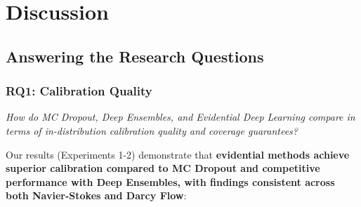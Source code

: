 \chapter{Discussion}

\section{Answering the Research Questions}

\subsection{RQ1: Calibration Quality}

\textit{How do MC Dropout, Deep Ensembles, and Evidential Deep Learning compare in terms of in-distribution calibration quality and coverage guarantees?}

Our results (Experiments 1-2) demonstrate that \textbf{evidential methods achieve superior calibration compared to MC Dropout and competitive performance with Deep Ensembles, with findings consistent across both Navier-Stokes and Darcy Flow}:

